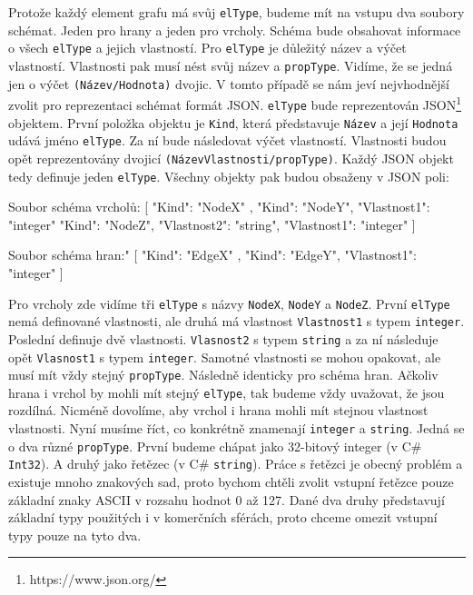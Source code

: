 Protože každý element grafu má svůj \verb+elType+, budeme mít na vstupu dva soubory schémat. 
Jeden pro hrany a jeden pro vrcholy.
Schéma bude obsahovat informace o všech \verb+elType+ a jejich vlastností.
Pro \verb+elType+ je důležitý název a výčet vlastností.
Vlastnosti pak musí nést svůj název a \verb+propType+.
Vidíme, že se jedná jen o výčet \verb+(Název/Hodnota)+ dvojic.
V tomto případě se nám jeví nejvhodnější zvolit pro reprezentaci schémat formát JSON.
\verb+elType+ bude reprezentován JSON\footnote{https://www.json.org/} objektem. 
První položka objektu je \verb+Kind+, která představuje \texttt{Název} a její \texttt{Hodnota} udává jméno \verb+elType+.
Za ní bude následovat výčet vlastností.
Vlastnosti budou opět reprezentovány dvojicí \verb+(NázevVlastnosti/propType)+.
Každý JSON objekt tedy definuje jeden \texttt{elType}.
Všechny objekty pak budou obsaženy v JSON poli:
\begin{code}
Soubor schéma vrcholů:
[    { "Kind": "NodeX" }, 
     { "Kind": "NodeY", "Vlastnost1": "integer" } 
     { "Kind": "NodeZ", "Vlastnost2": "string", 
       "Vlastnost1": "integer" }  ]
\end{code}
\begin{code}
Soubor schéma hran:"
[    { "Kind": "EdgeX" }, 
     { "Kind": "EdgeY", "Vlastnost1": "integer" } ]
\end{code}
Pro vrcholy zde vidíme tři \texttt{elType} s názvy \texttt{NodeX}, \texttt{NodeY} a \texttt{NodeZ}.
První \texttt{elType} nemá definované vlastnosti, ale druhá má vlastnost \texttt{Vlastnost1} s typem \texttt{integer}.
Poslední definuje dvě vlastnosti.
\texttt{Vlasnost2} s typem \texttt{string} a za ní následuje opět \texttt{Vlasnost1} s typem \texttt{integer}.
Samotné vlastnosti se mohou opakovat, ale musí mít vždy stejný \texttt{propType}.
Následně identicky pro schéma hran.
Ačkoliv hrana i vrchol by mohli mít stejný \texttt{elType}, tak budeme vždy uvažovat, že jsou rozdílná.
Nicméně dovolíme, aby vrchol i hrana mohli mít stejnou vlastnost vlastnosti.
Nyní musíme říct, co konkrétně znamenají \texttt{integer} a \texttt{string}.
Jedná se o dva různé \texttt{propType}.
První budeme chápat jako 32-bitový integer (v C\# \texttt{Int32}).
A druhý jako řetězec (v C\# \texttt{string}).
Práce s řetězci je obecný problém a existuje mnoho znakových sad, proto bychom chtěli zvolit vstupní řetězce pouze základní znaky ASCII v rozsahu hodnot 0 až 127.  
Dané dva druhy představují základní typy použitých i v komerčních sférách, proto chceme omezit vstupní typy pouze na tyto dva.

